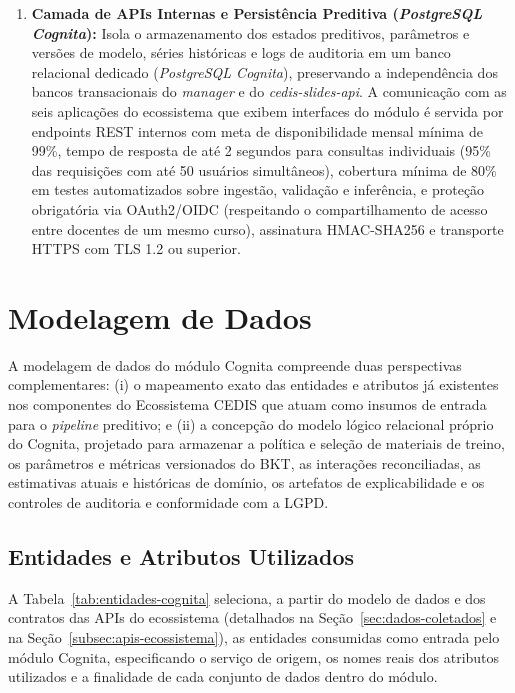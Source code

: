 \begin{enumerate}
    \item \textbf{Camada de APIs Internas e Persistência Preditiva (\textit{PostgreSQL Cognita}):} Isola o armazenamento dos estados preditivos, parâmetros e versões de modelo, séries históricas e logs de auditoria em um banco relacional dedicado (\textit{PostgreSQL Cognita}), preservando a independência dos bancos transacionais do \textit{manager} e do \textit{cedis-slides-api}. A comunicação com as seis aplicações do ecossistema que exibem interfaces do módulo é servida por endpoints REST internos com meta de disponibilidade mensal mínima de 99\%, tempo de resposta de até 2 segundos para consultas individuais (95\% das requisições com até 50 usuários simultâneos), cobertura mínima de 80\% em testes automatizados sobre ingestão, validação e inferência, e proteção obrigatória via OAuth2/OIDC (respeitando o compartilhamento de acesso entre docentes de um mesmo curso), assinatura HMAC-SHA256 e transporte HTTPS com TLS 1.2 ou superior.
\end{enumerate}


\section{Modelagem de Dados}
\label{sec:modelagem-dados}

A modelagem de dados do módulo Cognita compreende duas perspectivas complementares: (i) o mapeamento exato das entidades e atributos já existentes nos componentes do Ecossistema CEDIS que atuam como insumos de entrada para o \textit{pipeline} preditivo; e (ii) a concepção do modelo lógico relacional próprio do Cognita, projetado para armazenar a política e seleção de materiais de treino, os parâmetros e métricas versionados do BKT, as interações reconciliadas, as estimativas atuais e históricas de domínio, os artefatos de explicabilidade e os controles de auditoria e conformidade com a LGPD.

\subsection{Entidades e Atributos Utilizados}
\label{subsec:entidades-utilizadas}

A Tabela~\ref{tab:entidades-cognita} seleciona, a partir do modelo de dados e dos contratos das APIs do ecossistema (detalhados na Seção~\ref{sec:dados-coletados} e na Seção~\ref{subsec:apis-ecossistema}), as entidades consumidas como entrada pelo módulo Cognita, especificando o serviço de origem, os nomes reais dos atributos utilizados e a finalidade de cada conjunto de dados dentro do módulo.

